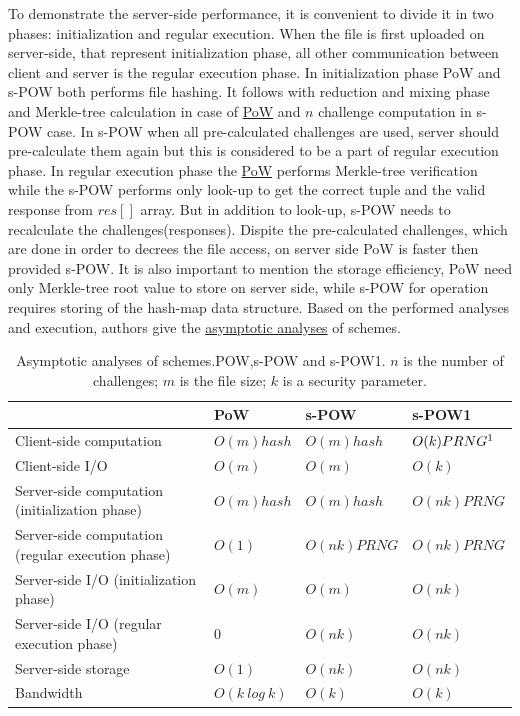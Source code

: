 \documentclass[12pt]{article}
\begin{document}
To demonstrate the server-side performance, it is convenient to divide it in two phases: initialization and regular execution. When the file is first uploaded on server-side, that represent initialization phase, all other communication between client and server is the regular execution phase. In initialization phase PoW and s-POW both performs file hashing. It follows with reduction and mixing phase and Merkle-tree calculation in case of  \hyperref[sub:Soltuion1]{PoW} and $n$ challenge computation in s-POW case. In s-POW when all pre-calculated challenges are used, server should pre-calculate them again but this is considered to be a part of regular execution phase. In regular execution phase the  \hyperref[sub:Soltuion1]{PoW}  performs Merkle-tree verification while the s-POW performs only look-up to get the correct tuple and the valid response from $res[]$  array. But in addition to look-up, s-POW needs to recalculate the challenges(responses). Dispite the pre-calculated challenges, which are done in order to decrees the file access, on server side PoW is faster then provided s-POW. It is also important to mention the storage efficiency, PoW need only Merkle-tree root value to store on server side, while s-POW for operation requires storing of the hash-map data structure.  Based on the performed analyses and execution, authors give the \hyperref[table:asymptoticAnalysis]{asymptotic analyses} of schemes. 


\begin{savenotes}
\begin{table}[!htpb]
\centering
\addtolength{\tabcolsep}{3pt}
\begin{tabular}{|L{6cm}|L{2.5cm}|L{2.5cm}|L{2.5cm}|}
\hline
&PoW&s-POW&s-POW1\\
\hline
Client-side computation&$O(m)hash$ & $O(m)hash$ & $O(k)PRNG\footnote{Pseudorandom number generator}$ \\
\hline
Client-side I/O&$O(m)$&$O(m)$&$O(k)$\\
\hline
Server-side computation (initialization phase)&$O(m) hash$&$O(m) hash$&$O(nk)PRNG$\\
\hline
Server-side computation (regular execution phase)&$O(1)$&$O(nk) PRNG$& $O(nk)PRNG$\\
\hline
Server-side I/O (initialization phase)&$O(m)$&$O(m)$&$O(nk)$\\
\hline
Server-side I/O (regular execution phase)&$0$&$O(nk)$&$O(nk)$\\
\hline
Server-side storage&$O(1)$&$O(nk)$&$O(nk)$\\
\hline
Bandwidth&$O(k\ log\ k)$&$O(k)$&$O(k)$\\
\hline

\end{tabular}
\caption{Asymptotic analyses of schemes.POW,s-POW and s-POW1. $n$ is the number of challenges; $m$ is the file size; $k$ is a security parameter.}
\label{table:asymptoticAnalysis}
\end{table}
\end{savenotes}
\end{document}
